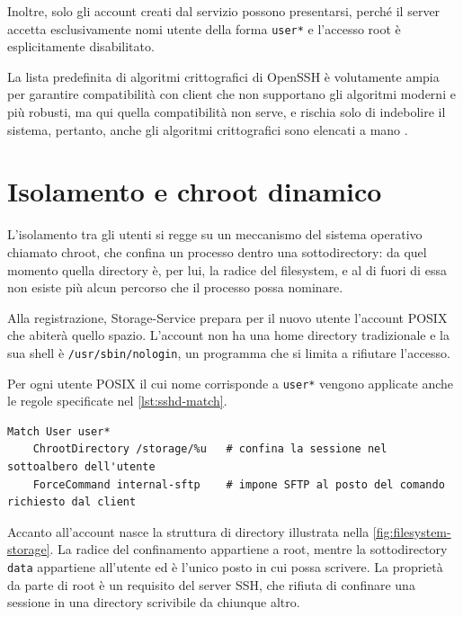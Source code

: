 Inoltre, solo gli account creati dal servizio possono presentarsi, perché il server accetta esclusivamente
nomi utente della forma \texttt{user*} e l'accesso root è esplicitamente disabilitato.

La lista predefinita di algoritmi crittografici di OpenSSH \cite{openssh-sshd-config} è volutamente ampia 
per garantire compatibilità con client che non supportano gli algoritmi moderni e più robusti, ma qui quella 
compatibilità non serve, e rischia solo di indebolire il sistema, pertanto, anche gli algoritmi 
crittografici sono elencati a mano \cite{ramusb-code-sshd-config}.

\section{Isolamento e chroot dinamico}
\label{sec:isolamento}

L'isolamento tra gli utenti si regge su un meccanismo del sistema operativo chiamato chroot, che
confina un processo dentro una sottodirectory: da quel momento quella directory è, per lui, la
radice del filesystem, e al di fuori di essa non esiste più alcun percorso che il processo possa
nominare.

Alla registrazione, Storage-Service prepara per il nuovo utente l'account POSIX che abiterà quello
spazio. L'account non ha una home directory tradizionale e la sua shell è \texttt{/usr/sbin/nologin},
un programma che si limita a rifiutare l'accesso.

Per ogni utente POSIX il cui nome corrisponde a \texttt{user*} vengono applicate anche le regole
specificate nel \autoref{lst:sshd-match}.

\begin{lstlisting}[language=sshdconfig, caption={Le due direttive per utente, da
\texttt{sshd\_config} \cite{ramusb-code-sshd-config}, con commenti aggiunti.},
label={lst:sshd-match}]
Match User user*
    ChrootDirectory /storage/%u   # confina la sessione nel sottoalbero dell'utente
    ForceCommand internal-sftp    # impone SFTP al posto del comando richiesto dal client
\end{lstlisting}

Accanto all'account nasce la struttura di directory illustrata nella
\autoref{fig:filesystem-storage}. La radice del confinamento appartiene a root, mentre la
sottodirectory \texttt{data} appartiene all'utente ed è l'unico posto in cui possa scrivere. La
proprietà da parte di root è un requisito del server SSH, che
rifiuta di confinare una sessione in una directory scrivibile da chiunque altro.

